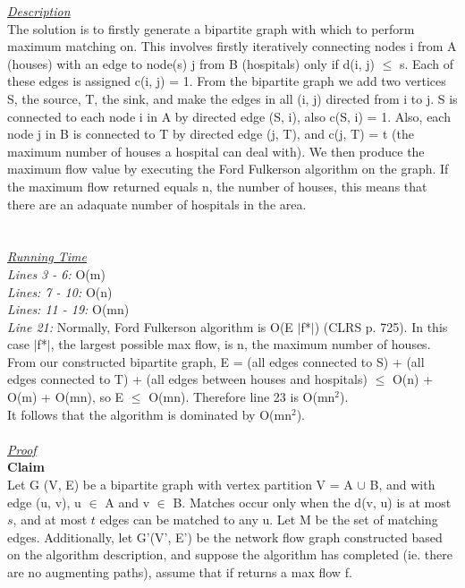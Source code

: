 \documentclass[10pt]{csc_assignment}
\begin{document}
\begin{description}
\begin{algorithm}[H]
\end{algorithm}
\emph{\underline{Description}}\\
The solution is to firstly generate a bipartite graph with which to perform maximum matching on.
This involves firstly iteratively connecting nodes i from A (houses) with an edge to node(s) j from B (hospitals) only if  d(i, j) $\leqslant$ s. Each of these edges is assigned c(i, j) = 1. From the bipartite graph we add two vertices S, the source, T, the sink, and make the edges in all (i, j) directed from i to j. S is connected to each node i in A by directed edge (S, i), also c(S, i) = 1. Also, each node j in B is connected to T by directed edge (j, T), and c(j, T) = t (the maximum number of houses a hospital can deal with). We then produce the maximum flow value by executing the Ford Fulkerson algorithm on the graph. If the maximum flow returned equals n, the number of houses, this means that there are an adaquate number of hospitals in the area.\\
\\
\\
\emph{\underline{Running Time}}\\
\emph{Lines 3 - 6:} O(m)\\
\emph{Lines: 7 - 10:} O(n)\\
\emph{Lines: 11 - 19:} O(mn)\\
\emph{Line 21:} Normally, Ford Fulkerson algorithm is O(E $\mid$f*$\mid$) (CLRS p. 725). In this case $\mid$f*$\mid$, the largest possible max flow, is n, the maximum number of houses. From our constructed bipartite graph, E = (all edges connected to S) + (all edges connected to T) + (all edges between houses and hospitals) $\leqslant$ O(n) + O(m) + O(mn), so E $\leqslant$ O(mn). Therefore line 23 is O(mn$^{2}$). \\
It follows that the algorithm is dominated by O(mn$^{2}$).\\
\\
\emph{\underline{Proof}}\\
\textbf{Claim}\\
Let G (V, E) be a bipartite graph with vertex partition V = A $\cup$ B, and with edge (u, v), u $\in$ A and v $\in$ B. Matches occur only when the d(v, u) is at most $s$, and at most $t$ edges can be matched to any u. Let M be the set of matching edges. Additionally, let G'(V', E') be the network flow graph constructed based on the algorithm description, and suppose the algorithm has completed (ie. there are no augmenting paths), assume that if returns a max flow f.\\ 

\end{description}
\end{document}
